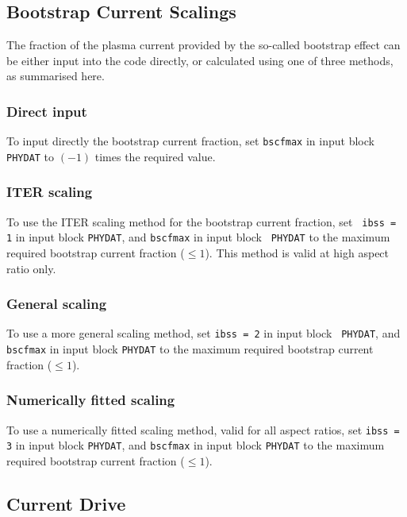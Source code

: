 \documentclass[11pt,a4paper]{report}
\begin{document}
\subsection{Bootstrap Current Scalings}

The fraction of the plasma current provided by the so-called bootstrap effect
can be either input into the code directly, or calculated using one of three
methods, as summarised here.

\subsubsection{Direct input}
To input directly the bootstrap current fraction, set {\tt bscfmax} in input
block {\tt PHYDAT} to $(-1)$ times the required value.

\subsubsection{ITER scaling \protect\cite{IPDG}}

To use the ITER scaling method for the bootstrap current fraction, set {\tt
ibss = 1} in input block {\tt PHYDAT}, and {\tt bscfmax} in input block {\tt
PHYDAT} to the maximum required bootstrap current fraction ($\leq 1$). This
method is valid at high aspect ratio only.

\subsubsection{General scaling \protect\cite{Nevins}}

To use a more general scaling method, set {\tt ibss = 2} in input block {\tt
PHYDAT}, and {\tt bscfmax} in input block {\tt PHYDAT} to the maximum required
bootstrap current fraction ($\leq 1$).

\subsubsection{Numerically fitted scaling \protect\cite{172}}

To use a numerically fitted scaling method, valid for all aspect ratios, set
{\tt ibss = 3} in input block {\tt PHYDAT}, and {\tt bscfmax} in input block
{\tt PHYDAT} to the maximum required bootstrap current fraction ($\leq 1$).

\subsection{Current Drive}
\end{document}
